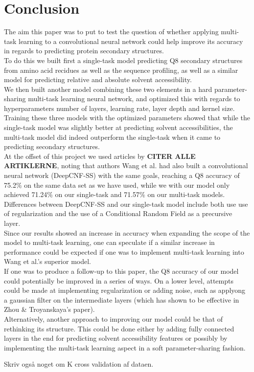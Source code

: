 \section{Conclusion}
The aim this paper was to put to test the question of whether applying multi-task learning to a convolutional neural network could help improve its accuracy in regards to predicting protein secondary structures.\\
To do this we built first a single-task model predicting Q8 secondary structures from amino acid recidues as well as the sequence profiling, as well as a similar model for predicting relative and absolute solvent accessibility.\\
We then built another model combining these two elements in a hard parameter-sharing multi-task learning neural network, and optimized this with regards to hyperparameters number of layers, learning rate, layer depth and kernel size.\\
Training these three models with the optimized parameters showed that while the single-task model was slightly better at predicting solvent accessibilities, the multi-task model did indeed outperform the single-task when it came to predicting secondary structures.\\
At the offset of this project we used articles by \textbf{CITER ALLE ARTIKLERNE}, noting that authors Wang et al. had also built a convolutional neural network (DeepCNF-SS) with the same goals, reaching a Q8 accuracy of 75.2\% on the same data set as we have used, while we with our model only achieved 71.24\% on our single-task and 71.57\% on our multi-task models. Differences between DeepCNF-SS and our single-task model include both use use of regularization and the use of a Conditional Random Field as a precursive layer. \\
Since our results showed an increase in accuracy when expanding the scope of the model to multi-task learning, one can speculate if a similar increase in performance could be expected if one was to implement multi-task learning into Wang et al.'s superior model.\\
If one was to produce a follow-up to this paper, the Q8 accuracy of our model could potentially be improved in a series of ways. On a lower level, attempts could be made at implementing regularization or adding noise, such as applyong a gaussian filter on the intermediate layers (which has shown to be effective in Zhou \& Troyanskaya's paper).\\
Alternatively, another approach to improving our model could be that of rethinking its structure. This could be done either by adding fully connected layers in the end for predicting solvent accessibility features or possibly by implementing the multi-task learning aspect in a soft parameter-sharing fashion.


Skriv også noget om K cross validation af dataen.